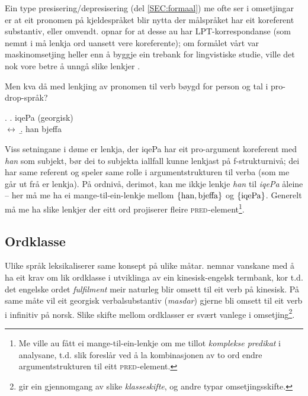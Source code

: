 \documentclass[11pt,a4paper,oneside,draft]{book}
\newcommand{\F}[2]{\textsc{#1}\ensuremath{_{#2}}}
\newcommand{\PRED}{\F{pred}{}}
\begin{document}
 
Ein type presisering/depresisering (del \ref{SEC:formaal}) me ofte ser
i omsetjingar er at eit pronomen på kjeldespråket blir nytta der
målspråket har eit koreferent substantiv, eller
omvendt. \citet{dyvik2009lmp} opnar for at desse au har
LPT-korrespondanse (som nemnt i \cite{thunes2003eal} må lenkja ord
uansett vere koreferente); om formålet vårt var maskinomsetjing heller
enn å byggje ein trebank for lingvistiske studie, ville det nok vore
betre å unngå slike lenkjer \citep[s.~53]{volk2008hjp}.

Men kva då med lenkjing av pronomen til verb bøygd for person og tal i
pro-drop-språk?

\ex. \a. iqePa                                  \hfill{} (georgisk) \\
     $\leftrightarrow$
     \b. han bjeffa

Viss setningane i døme \Last er lenkja, der iqePa har eit pro-argument
koreferent med \emph{han} som subjekt, bør dei to subjekta iallfall kunne
lenkjast på f-strukturnivå; dei har same referent og speler same rolle
i argumentstrukturen til verba (som me går ut frå er lenkja). På
ordnivå, derimot, kan me ikkje lenkje \emph{han} til \emph{iqePa} åleine -- her
må me ha ei mange-til-ein-lenkje mellom $\{ \rm han, bjeffa \}$ og $\{
\rm iqePa \}$. 
Generelt må me ha slike lenkjer der eitt ord projiserer fleire
\PRED{}-element\footnote{Me ville au fått ei mange-til-ein-lenkje om me tillot
        \emph{komplekse predikat} i analysane, t.d. slik
        \citet{butt1998merger} foreslår ved å la kombinasjonen av to
        ord endre argumentstrukturen til eitt \PRED{}-element. }.

\subsection{Ordklasse}
\label{sec-3.5.1}

Ulike språk leksikaliserer same konsept på ulike
måtar. \citet[s.~3]{cheung2002scg} nemnar vanskane med å ha eit krav
om lik ordklasse i utviklinga av ein kinesisk-engelsk termbank, kor
t.d. det engelske ordet \emph{fulfilment} meir naturleg blir omsett til eit
verb på kinesisk. På same måte vil eit georgisk verbalsubstantiv
(\emph{masdar}) gjerne bli omsett til eit verb i infinitiv på
norsk. Slike skifte mellom ordklasser er svært vanlege i
omsetjing\footnote{\citet[Catford~(1965),~i][s.~61]{munday2001its} gir ein gjennomgang av
       slike \emph{klasseskifte}, og andre typar omsetjingsskifte. }.
\end{document}
